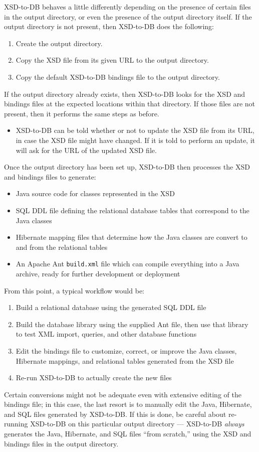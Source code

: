 \documentclass[11pt]{article}
\begin{document}
XSD-to-DB behaves a little differently depending on the presence of certain files in the output directory, or even the presence of the output directory itself.  If the output directory is not present, then XSD-to-DB does the following:
\begin{enumerate}
\item Create the output directory.
\item Copy the XSD file from its given URL to the output directory.
\item Copy the default XSD-to-DB bindings file to the output directory.
\end{enumerate}
If the output directory already exists, then XSD-to-DB looks for the XSD and bindings files at the expected locations within that directory.  If those files are not present, then it performs the same steps as before.
\begin{itemize}
\item XSD-to-DB can be told whether or not to update the XSD file from its URL, in case the XSD file might have changed.  If it is told to perform an update, it will ask for the URL of the updated XSD file.
\end{itemize}
Once the output directory has been set up, XSD-to-DB then processes the XSD and bindings files to generate:
\begin{itemize}
\item Java source code for classes represented in the XSD
\item SQL DDL file defining the relational database tables that correspond to the Java classes
\item Hibernate mapping files that determine how the Java classes are convert to and from the relational tables
\item An Apache Ant \texttt{build.xml} file which can compile everything into a Java archive, ready for further development or deployment
\end{itemize}
From this point, a typical workflow would be:
\begin{enumerate}
\item Build a relational database using the generated SQL DDL file
\item Build the database library using the supplied Ant file, then use that library to test XML import, queries, and other database functions
\item Edit the bindings file to customize, correct, or improve the Java classes, Hibernate mappings, and relational tables generated from the XSD file
\item Re-run XSD-to-DB to actually create the new files
\end{enumerate}
Certain conversions might not be adequate even with extensive editing of the bindings file; in this case, the last resort is to manually edit the Java, Hibernate, and SQL files generated by XSD-to-DB.  If this is done, be careful about re-running XSD-to-DB on this particular output directory --- XSD-to-DB \emph{always} generates the Java, Hibernate, and SQL files ``from scratch,'' using the XSD and bindings files in the output directory.
\end{document}
